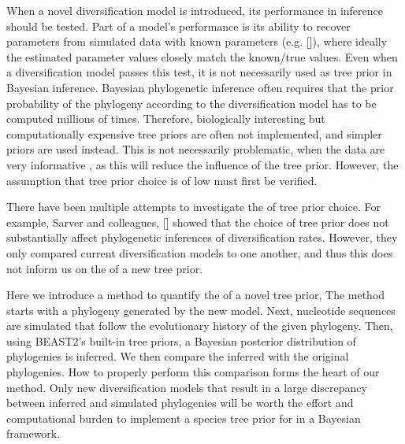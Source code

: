 When a novel diversification model is introduced,
its performance in inference should be tested.
Part of a model's performance is its ability to 
recover parameters from simulated data with known 
parameters (e.g. [\cite{etienne2014estimating}]), 
where ideally the estimated parameter values closely match the known/true values.
Even when a diversification model passes this test, 
it is not necessarily used as tree prior in Bayesian inference.
Bayesian phylogenetic inference often requires 
that the prior probability of the phylogeny 
according to the diversification model has to be computed millions of times. 
Therefore, biologically interesting but computationally expensive tree priors 
are often not implemented, and simpler priors are used instead. 
This is not necessarily problematic, when the data are very informative 
, 
as this will reduce the influence of the tree prior.
However, the assumption that tree prior choice is of low  
must first be verified.

There have been multiple attempts to investigate the  of tree
prior choice. For example, Sarver and colleagues, [\cite{sarver2019choice}] 
showed that the choice of tree prior does not 
substantially affect phylogenetic inferences of diversification rates.
However, they only compared current diversification models to one another, 
and thus this does not inform us on the  of a new tree prior.


Here we introduce a method to quantify the  
of a novel tree prior,
The method starts with a phylogeny generated by the new model. 
Next, nucleotide sequences are simulated that follow the evolutionary 
history of the given phylogeny. 
Then, using BEAST2's built-in tree priors,
a Bayesian posterior distribution of phylogenies is inferred. 
We then compare the inferred with the original phylogenies. 
How to properly perform this comparison forms the heart of our method.
Only new diversification models that result 
in a large discrepancy between inferred and simulated phylogenies 
will be worth the effort and computational burden to implement 
a species tree prior for in a Bayesian framework.

